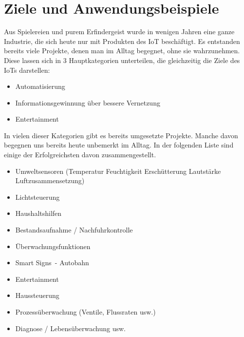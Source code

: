 \section{Ziele und Anwendungsbeispiele}\label{s:IoTZiele}

Aus Spielereien und purem Erfindergeist wurde in wenigen Jahren eine ganze Industrie, die sich heute nur mit Produkten des \ac{IoT} beschäftigt. Es entstanden bereits viele Projekte, denen man im Alltag begegnet, ohne sie wahrzunehmen. 
Diese lassen sich in 3 Hauptkategorien unterteilen, die gleichzeitig die Ziele des \ac{IoT}s darstellen:

\begin{itemize}
	\item Automatisierung
	\item Informationsgewinnung über bessere Vernetzung
	\item Entertainment
\end{itemize}

In vielen dieser Kategorien gibt es bereits umgesetzte Projekte. Manche davon begegnen uns bereits heute unbemerkt im Alltag.
In der folgenden Liste sind einige der Erfolgreichsten davon zusammengestellt.

\begin{itemize} 
\item Umweltsensoren (Temperatur Feuchtigkeit Erschütterung Lautstärke Luftzusammensetzung) 
\item Lichtsteuerung
\item Haushaltshilfen
\item Bestandsaufnahme / Nachfuhrkontrolle
\item Überwachungsfunktionen
\item \glqq Smart Signs\grqq\ - Autobahn
\item Entertainment
\item Haussteuerung
\item Prozessüberwachung (Ventile, Flussraten usw.)
\item Diagnose / Lebensüberwachung usw.
\end{itemize}